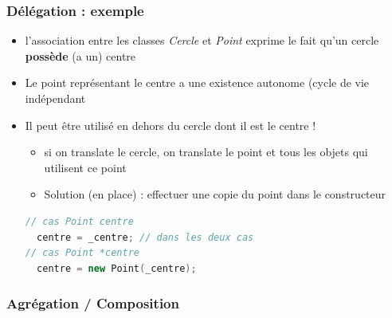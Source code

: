 \begin{frame}[fragile]
\frametitle{Délégation : exemple}
\begin{itemize}
	\item l'association entre les classes \emph{Cercle} et \emph{Point} exprime le fait qu'un cercle \textbf{possède} (a un) centre
	\item Le point représentant le centre a une existence autonome (cycle de vie indépendant
	\item Il peut être utilisé en dehors du cercle dont il est le centre !
	\begin{itemize}
		\item si on translate le cercle, on translate le point et tous les objets qui utilisent ce point
		\item Solution (en place) : effectuer une copie du point dans le constructeur
	\end{itemize}
\begin{lstlisting}[language=C++]
// cas Point centre
  centre = _centre; // dans les deux cas
// cas Point *centre
  centre = new Point(_centre);
\end{lstlisting}
\end{itemize}
\end{frame}

\subsubsection*{Agrégation / Composition}

